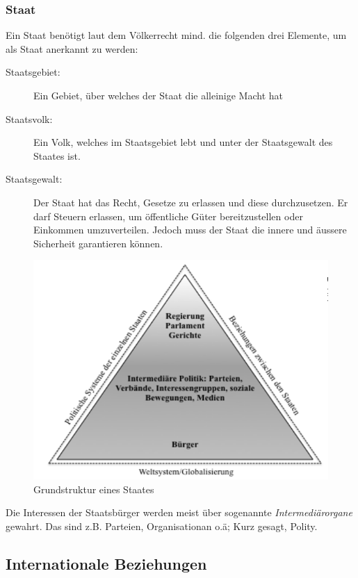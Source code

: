 \documentclass[a4paper, 11pt]{article}
\begin{document}
\subsubsection{Staat}
Ein Staat benötigt laut dem Völkerrecht mind. die folgenden drei Elemente, um als Staat anerkannt zu werden: 
\begin{description}
    \item[Staatsgebiet: ] Ein Gebiet, über welches der Staat die alleinige Macht hat
    \item[Staatsvolk: ] Ein Volk, welches im Staatsgebiet lebt und unter der Staatsgewalt des Staates ist.
    \item[Staatsgewalt: ] Der Staat hat das Recht, Gesetze zu erlassen und diese durchzusetzen. Er darf Steuern erlassen, um öffentliche Güter bereitzustellen oder Einkommen umzuverteilen. Jedoch muss der Staat die innere und äussere Sicherheit garantieren können.
\end{description}

\begin{figure}[htb]
    \centering
    \includegraphics[keepaspectratio=true,height=15\baselineskip]{analytische_grundstruktur.png}
    \caption{Grundstruktur eines Staates}
    \label{fig:grundstrk_staat}
\end{figure}

Die Interessen der Staatsbürger werden meist über sogenannte \textit{Intermediärorgane} gewahrt. Das sind z.B. Parteien, Organisationan o.ä; Kurz gesagt, Polity.

\newpage

\subsection{Internationale Beziehungen}
\end{document}
